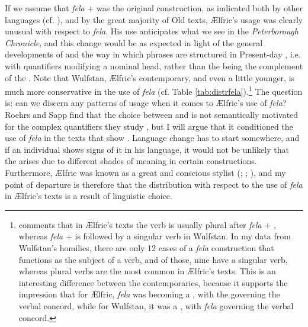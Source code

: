 \documentclass[output=paper,colorlinks,citecolor=brown]{langscibook}
\begin{document}
If we assume that \textit{fela} +  was the original construction, as indicated both by other  languages (cf. \cite{RoehrsSapp16}), and by the great majority of Old  texts, Ælfric’s usage was clearly unusual with respect to \textit{fela}. His use anticipates what we see in the \textit{Peterborough Chronicle}, and this change would be as expected in light of the general developments of  and the way in which  phrases are structured in Present-day , i.e. with quantifiers modifying a nominal head, rather than the  being the complement of the . Note that Wulfstan, Ælfric’s contemporary, and even a little younger, is much more conservative in the use of \textit{fela }(cf. Table \ref{tab:distrfela}).\footnote{\citet[vol. I, 174]{Mitchell85} comments that in Ælfric's texts the verb is usually plural after \textit{fela} + , whereas \textit{fela} +  is followed by a singular verb in Wulfstan. In my data from Wulfstan’s homilies, there are only 12 cases of a \textit{fela} construction that functions as the subject of a verb, and of those, nine have a singular verb, whereas plural verbs are the most common in Ælfric's texts. This is an interesting difference between the contemporaries, because it supports the impression that for Ælfric, \textit{fela} was becoming a , with the  governing the verbal concord, while for Wulfstan, it was a , with \textit{fela} governing the verbal concord.} The question is: can we discern any patterns of usage when it comes to Ælfric’s use of \textit{fela}? Roehrs and Sapp find that the choice between  and  is not semantically motivated for the complex quantifiers they study \citeyearpar[417]{RoehrsSapp18}, but I will argue that it conditioned the use of \textit{fela }in the texts that show . Language change has to start somewhere, and if an individual shows signs of it in his language, it would not be unlikely that the  arises due to different shades of meaning in certain constructions. Furthermore, Ælfric was known as a great and conscious stylist (\cite{Gatch1977}; \cite{Godden2004}; \cite{Harris2006}), and my point of departure is therefore that the distribution with respect to the use of \textit{fela} in Ælfric's texts is a result of linguistic choice.
\end{document}
